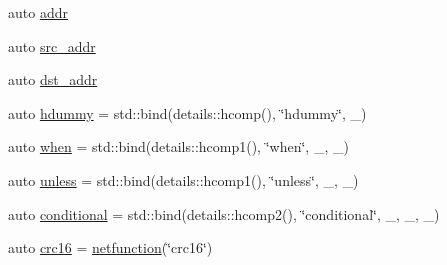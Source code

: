 \begin{DoxyCompactItemize}
\item 
auto \hyperlink{namespacepfq__lang_1_1anonymous__namespace_02default_8hpp_03_aafce8334d1be83bff9a2115439c8c453}{addr}
\item 
auto \hyperlink{namespacepfq__lang_1_1anonymous__namespace_02default_8hpp_03_a63c87ff605d7cefa807fd61bc463785d}{src\+\_\+addr}
\item 
auto \hyperlink{namespacepfq__lang_1_1anonymous__namespace_02default_8hpp_03_a4b72bac7c3af312ffe7c670eb2583f9a}{dst\+\_\+addr}
\item 
auto \hyperlink{namespacepfq__lang_1_1anonymous__namespace_02default_8hpp_03_a4e7cf4874b42c5722f420fc54f360242}{hdummy} = std\+::bind(details\+::hcomp(), \char`\"{}hdummy\char`\"{}, \+\_)
\item 
auto \hyperlink{namespacepfq__lang_1_1anonymous__namespace_02default_8hpp_03_a10e1a2f363aa41a978622f322ac6241f}{when} = std\+::bind(details\+::hcomp1(), \char`\"{}when\char`\"{}, \+\_, \+\_)
\item 
auto \hyperlink{namespacepfq__lang_1_1anonymous__namespace_02default_8hpp_03_af01f3831a7b0294b6ffef87a09b481d7}{unless} = std\+::bind(details\+::hcomp1(), \char`\"{}unless\char`\"{}, \+\_, \+\_)
\item 
auto \hyperlink{namespacepfq__lang_1_1anonymous__namespace_02default_8hpp_03_a022d0075edf2fff575b93377aec0c228}{conditional} = std\+::bind(details\+::hcomp2(), \char`\"{}conditional\char`\"{}, \+\_, \+\_, \+\_)
\item 
auto \hyperlink{namespacepfq__lang_1_1anonymous__namespace_02default_8hpp_03_aaa12e1daf6bd2719a3b8592e673acf84}{crc16} = \hyperlink{namespacepfq__lang_a9f546a4602872df5ca74050ecb68a6b3}{netfunction}(\char`\"{}crc16\char`\"{})
\end{DoxyCompactItemize}


